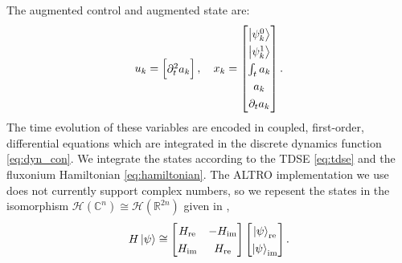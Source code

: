 The augmented control and augmented state are:
\begin{equation}
  \begingroup
  \renewcommand*{\arraystretch}{1.3}
  u_{k} = \begin{bmatrix} \partial^{2}_{t} a_{k} \end{bmatrix}, \quad
  x_{k} = \begin{bmatrix} \ket{\psi^{0}_{k}} \\ \ket{\psi^{1}_{k}}
    \\ \int_{t} a_{k} \\ a_{k} \\ \partial_{t} a_{k} \end{bmatrix}.
  \endgroup
  \label{eq:astatecontrols}
\end{equation}
The time evolution of these variables are encoded
in coupled, first-order, differential equations
which are integrated in the discrete dynamics function \eqref{eq:dyn_con}.
We integrate the states according to the TDSE \eqref{eq:tdse} and the
fluxonium Hamiltonian \eqref{eq:hamiltonian}.
The ALTRO implementation we use does not currently
support complex numbers, so we repesent the states
in the isomorphism $\mathcal{H}(\mathbb{C}^{n})
\cong \mathcal{H}(\mathbb{R}^{2n})$ given in \cite{leung2017speedup},
\begin{equation}
  H \ket{\psi} \cong \begin{bmatrix} H_{\textrm{re}} & -H_{\textrm{im}}
    \\ H_{\textrm{im}} & H_{\textrm{re}}\end{bmatrix}
  \begin{bmatrix} \ket{\psi}_{\textrm{re}} \\ \ket{\psi}_{\textrm{im}}\end{bmatrix}.
  \label{eq:isomorphism}
\end{equation}

